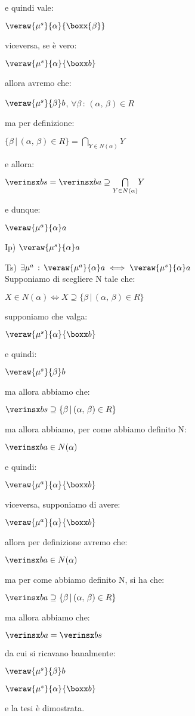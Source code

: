 e quindi vale:

$\veraw{\mu^{s}}{\alpha}{\boxx{\beta}}$

viceversa, se è vero:

$\veraw{\mu^{s}}{\alpha}{\boxx b}$

allora avremo che:

$\veraw{\mu^{s}}{\beta}b$, $\forall\beta\,:\,(\alpha,\,\beta)\in R$

ma per definizione:

$\{\beta\,|\,(\alpha,\,\beta)\in R\}=\underset{Y\in N(\alpha)}{\bigcap}Y$

e allora:

$\verinsx bs=\verinsx ba\supseteq\underset{Y\in N(\alpha)}{\bigcap}Y$

e dunque:

$\veraw{\mu^{a}}{\alpha}a$

Ip) $\veraw{\mu^{s}}{\alpha}a$

Ts) $\exists\mu^{a}\,:\,\veraw{\mu^{a}}{\alpha}a\iff\veraw{\mu^{s}}{\alpha}a$\\


Supponiamo di scegliere N tale che:

$X\in N(\alpha)\iff X\supseteq\{\beta\,|\,(\alpha,\,\beta)\in R\}$

supponiamo che valga:

$\veraw{\mu^{s}}{\alpha}{\boxx b}$

e quindi:

$\veraw{\mu^{s}}{\beta}b$

ma allora abbiamo che:

$\verinsx bs\supseteq\{\beta\,|\,(\alpha,\,\beta)\in R\}$

ma allora abbiamo, per come abbiamo definito N:

$\verinsx ba\in N(\alpha)$

e quindi:

$\veraw{\mu^{a}}{\alpha}{\boxx b}$

viceversa, supponiamo di avere:

$\veraw{\mu^{a}}{\alpha}{\boxx b}$

allora per definizione avremo che:

$\verinsx ba\in N(\alpha)$

ma per come abbiamo definito N, si ha che:

$\verinsx ba\supseteq\{\beta\,|\,(\alpha,\,\beta)\in R\}$

ma allora abbiamo che:

$\verinsx ba=\verinsx bs$

da cui si ricavano banalmente:

$\veraw{\mu^{s}}{\beta}b$

$\veraw{\mu^{s}}{\alpha}{\boxx b}$

e la tesi è dimostrata.
